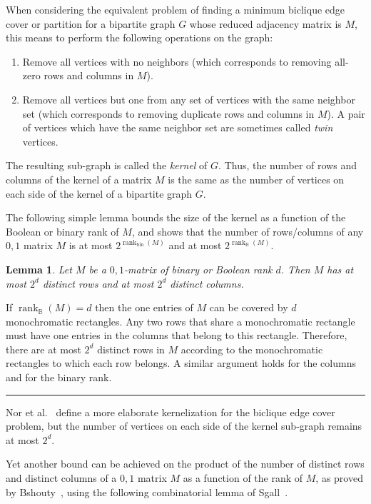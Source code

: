 \documentclass[11pt]{article}
\newtheorem{lemma}[theorem]{Lemma}
\newcommand{\qedsymb}{\hfill{\rule{2mm}{2mm}}}
\renewenvironment{proof}[1][]{\begin{trivlist}
\item[\hspace{\labelsep}{\bf\noindent Proof#1:\/}] }{\qedsymb\end{trivlist}}
\newcommand{\rank}{\mathop{\mathrm{rank}}}
\newcommand{\Rbool}{{\rank}_\mathbb{B}}
\newcommand{\Rbin}{{\rank}_{\mathrm{bin}}}
\begin{document}
When considering the equivalent problem of finding a minimum biclique edge cover or partition for a bipartite graph $G$ whose reduced adjacency matrix is $M$,
this means to perform the following operations on the graph:
\begin{enumerate}
\item Remove all vertices with no neighbors (which corresponds to removing all-zero rows and columns in $M$).
\item Remove all vertices but one from any set of vertices with the same neighbor set (which corresponds to removing duplicate rows and columns in $M$).
A pair of vertices which have the same neighbor set are sometimes called {\em twin} vertices.
\end{enumerate}

The resulting sub-graph is called the {\em kernel} of $G$.
Thus, the number of rows and columns of the kernel of a matrix $M$ is the same as the number of vertices on each side of the kernel of a bipartite graph $G$.

The following simple lemma bounds the size of the kernel as a function of the Boolean or binary rank of $M$, and shows that the number of rows/columns of any $0,1$ matrix $M$
is at most $2^{\Rbin(M)}$ and at most $2^{\Rbool(M)}$.

\begin{lemma}
\label{lem:binary_size of matrix}
Let $M$ be a $0,1$-matrix of binary or Boolean rank  $d$.
Then $M$ has at most $2^d$ distinct rows and at most $2^d$ distinct columns.
\end{lemma}
\begin{proof}
If $\Rbool(M) = d$  then the  one entries of $M$ can be covered by $d$ monochromatic rectangles.
Any two rows that share a monochromatic rectangle must have one entries in the columns that belong to this rectangle.
Therefore, there are at most $2^d$ distinct rows in $M$ according to the monochromatic rectangles to which each row belongs.
A similar argument holds for the columns and for the binary rank.
\end{proof}

Nor et al.~\cite{nor2012mod} define a more elaborate kernelization for the biclique edge cover problem,
but the number of vertices on each side of the kernel sub-graph remains at most $2^d$.

Yet another bound can be achieved on the product of the number of distinct rows and distinct columns of a $0,1$ matrix $M$ as a function of the rank of $M$,
as proved by Bshouty~\cite{bshouty2023property}, using the following combinatorial lemma of Sgall~\cite{sgall1999bounds}.
\end{document}
